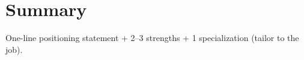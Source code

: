 
\section{Summary}
\small
\noindent
One-line positioning statement + 2--3 strengths + 1 specialization (tailor to the job).
